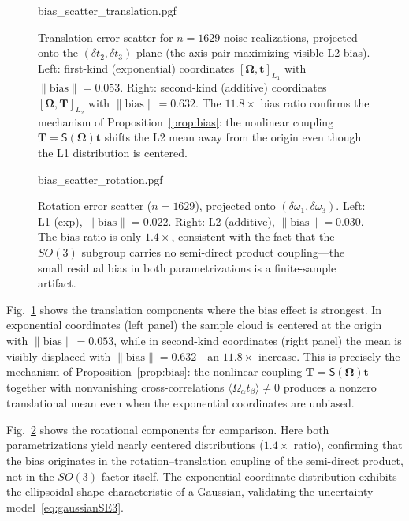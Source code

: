 \documentclass[journal]{IEEEtran}
\newcommand{\bfOmega}{\boldsymbol{\Omega}}
\begin{document}
\begin{figure}[t]
    \centering
    {bias_scatter_translation.pgf}
    \caption{Translation error scatter for $n=1629$ noise
    realizations, projected onto the $(\delta t_2, \delta t_3)$
    plane (the axis pair maximizing visible L2 bias).
    Left: first-kind (exponential) coordinates
    $[\bfOmega,\mathbf{t}]_{L_1}$ with
    $\|\mathrm{bias}\|=0.053$.
    Right: second-kind (additive) coordinates
    $[\bfOmega,\mathbf{T}]_{L_2}$ with
    $\|\mathrm{bias}\|=0.632$.
    The $11.8\times$ bias ratio confirms the mechanism of
    Proposition~\ref{prop:bias}: the nonlinear coupling
    $\mathbf{T}=\mathsf{S}(\bfOmega)\mathbf{t}$ shifts the
    L2 mean away from the origin even though the L1
    distribution is centered.}
    \label{fig:bias_translation}
\end{figure}
 
\begin{figure}[t]
    \centering
    {bias_scatter_rotation.pgf}
    \caption{Rotation error scatter ($n=1629$), projected onto
    $(\delta\omega_1, \delta\omega_3)$.
    Left: L1 (exp), $\|\mathrm{bias}\|=0.022$.
    Right: L2 (additive), $\|\mathrm{bias}\|=0.030$.
    The bias ratio is only $1.4\times$, consistent with
    the fact that the $SO(3)$ subgroup carries no
    semi-direct product coupling---the small residual bias
    in both parametrizations is a finite-sample artifact.}
    \label{fig:bias_rotation}
\end{figure}
 
Fig.~\ref{fig:bias_translation} shows the translation
components where the bias effect is strongest.
In exponential coordinates (left panel) the sample cloud
is centered at the origin with $\|\mathrm{bias}\|=0.053$,
while in second-kind coordinates (right panel) the mean
is visibly displaced with $\|\mathrm{bias}\|=0.632$---an
$11.8\times$ increase. This is precisely the mechanism of
Proposition~\ref{prop:bias}: the nonlinear coupling
$\mathbf{T}=\mathsf{S}(\bfOmega)\mathbf{t}$ together
with nonvanishing cross-correlations
$\langle\Omega_\alpha t_\beta\rangle\neq 0$ produces a
nonzero translational mean even when the exponential
coordinates are unbiased.
 
Fig.~\ref{fig:bias_rotation} shows the rotational components
for comparison. Here both parametrizations yield nearly
centered distributions ($1.4\times$ ratio), confirming that
the bias originates in the rotation--translation coupling
of the semi-direct product, not in the $SO(3)$ factor itself.
The exponential-coordinate distribution exhibits the
ellipsoidal shape characteristic of a Gaussian, validating
the uncertainty model~\eqref{eq:gaussianSE3}.
\end{document}
